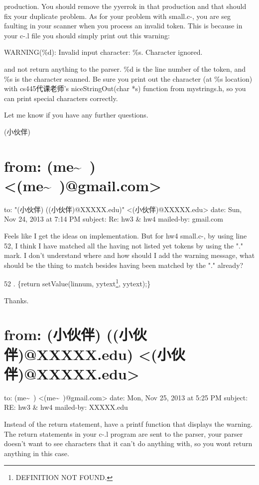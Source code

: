 \documentclass[12pt]{book}
\begin{document}
production. You should remove the yyerrok in that production and that should fix your duplicate problem. As for your problem with small.c-, you are seg faulting in your scanner when you process an invalid token. This is because in your c-.l file you should simply print out this warning:

WARNING(\%d): Invalid input character: \%s. Character ignored.

and not return anything to the parser. \%d is the line number of the token, and \%s is the character scanned. Be sure you print out the character (at \%s location) with cs445代课老师's niceStringOut(char *s) function from mystrings.h, so you can print special characters correctly.

Let me know if you have any further questions. 

(小伙伴)


\section{from:         (me\textasciitilde{}~) <(me\textasciitilde{}~)@gmail.com>}
\label{sec-1-3}
to:         "(小伙伴) ((小伙伴)@XXXXX.edu)" <(小伙伴)@XXXXX.edu>
date:         Sun, Nov 24, 2013 at 7:14 PM
subject:         Re: hw3 \& hw4
mailed-by:         gmail.com

Feels like I get the ideas on implementation. But for hw4 small.c-, by using line 52, I think I have matched all the having not listed yet tokens by using the "." mark. I don't understand where and how should I add the warning message, what should be the thing to match besides having been matched by the "." already?

52 .                       \{return setValue(linnum, yytext\footnote{DEFINITION NOT FOUND.}, yytext);\}

Thanks. 


\section{from:         (小伙伴) ((小伙伴)@XXXXX.edu) <(小伙伴)@XXXXX.edu>}
\label{sec-1-4}
to:         (me\textasciitilde{}~) <(me\textasciitilde{}~)@gmail.com>
date:         Mon, Nov 25, 2013 at 5:25 PM
subject:         RE: hw3 \& hw4
mailed-by:         XXXXX.edu

Instead of the return statement, have a printf function that displays the warning. The return statements in your c-.l program are sent to the parser, your parser doesn't want to see characters that it can't do anything with, so you wont return anything in this case.
\end{document}
